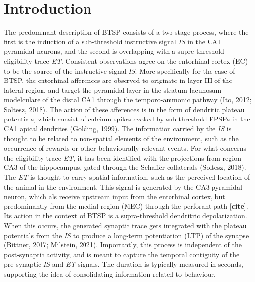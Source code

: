 \section{Introduction}


The predominant description of BTSP consists of a two-stage process, where the first is the induction of a sub-threshold instructive signal \textit{IS} in the CA1 pyramidal neurons, and the second is overlapping with a supre-threshold eligibility trace \textit{ET}.
Consistent observations agree on the entorhinal cortex (EC) to be the source of the instructive signal \textit{IS}.
More specifically for the case of BTSP, the entorhinal afferences are observed to originate in layer III of the lateral region, and target the pyramidal layer in the stratum lacunosum modelculare of the distal CA1 through the temporo-ammonic pathway (Ito, 2012; Soltesz, 2018).
The action of these afferences is in the form of dendritic plateau potentials, which consist of calcium spikes evoked by sub-threshold EPSPs in the CA1 apical dendrites (Golding, 1999).
The information carried by the \textit{IS} is thought to be related to non-spatial elements of the environment, such as the occurrence of rewards or other behaviourally relevant events.
For what concerns the eligibility trace \textit{ET}, it has been identified with the projections from region CA3 of the hippocampus, gated through the Schaffer collaterals (Soltesz, 2018).
The \textit{ET} is thought to carry spatial information, such as the perceived location of the animal in the environment. This signal is generated by the CA3 pyramidal neuron, which als receive upstream input from the entorhinal cortex, but predominantly from the medial region (MEC) through the
perforant path [\textbf{cite}]. 
Its action in the context of BTSP is a supra-threshold dendritric depolarization. When this occurs, the generated synaptic trace gets integrated with the plateau potentials from the \textit{IS} to produce a long-term potentiation (LTP) of the synapse (Bittner, 2017; Milstein, 2021).
Importantly, this process is independent of the post-synaptic activity, and is meant to capture the temporal contiguity of the pre-synaptic \textit{IS} and \textit{ET} signals. The duration is typically measured in seconds, supporting the idea of consolidating information related to behaviour.
